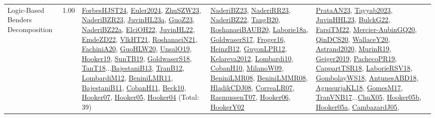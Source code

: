 {\begin{longtable}{p{3cm}r>{\raggedright\arraybackslash}p{6cm}>{\raggedright\arraybackslash}p{6cm}>{\raggedright\arraybackslash}p{8cm}}
\index{Logic-Based Benders Decomposition}\index{Concepts!Logic-Based Benders Decomposition}Logic-Based Benders Decomposition &  1.00 & \hyperref[detail:ForbesHJST24]{ForbesHJST24}, \hyperref[detail:Euler2024]{Euler2024}, \hyperref[detail:ZhuSZW23]{ZhuSZW23}, \hyperref[detail:NaderiBZR23]{NaderiBZR23}, \hyperref[detail:JuvinHL23a]{JuvinHL23a}, \hyperref[detail:GuoZ23]{GuoZ23}, \hyperref[detail:NaderiBZ22a]{NaderiBZ22a}, \hyperref[detail:ElciOH22]{ElciOH22}, \hyperref[detail:JuvinHL22]{JuvinHL22}, \hyperref[detail:EmdeZD22]{EmdeZD22}, \hyperref[detail:VlkHT21]{VlkHT21}, \hyperref[detail:RoshanaeiN21]{RoshanaeiN21}, \hyperref[detail:FachiniA20]{FachiniA20}, \hyperref[detail:GuoHLW20]{GuoHLW20}, \hyperref[detail:UnsalO19]{UnsalO19}, \hyperref[detail:Hooker19]{Hooker19}, \hyperref[detail:SunTB19]{SunTB19}, \hyperref[detail:GoldwaserS18]{GoldwaserS18}, \hyperref[detail:TanT18]{TanT18}...\hyperref[detail:BajestaniB13]{BajestaniB13}, \hyperref[detail:TranB12]{TranB12}, \hyperref[detail:LombardiM12]{LombardiM12}, \hyperref[detail:BeniniLMR11]{BeniniLMR11}, \hyperref[detail:BajestaniB11]{BajestaniB11}, \hyperref[detail:CobanH11]{CobanH11}, \hyperref[detail:Beck10]{Beck10}, \hyperref[detail:Hooker07]{Hooker07}, \hyperref[detail:Hooker05]{Hooker05}, \hyperref[detail:Hooker04]{Hooker04} (Total: 39) & \hyperref[detail:NaderiBZ23]{NaderiBZ23}, \hyperref[detail:NaderiRR23]{NaderiRR23}, \hyperref[detail:NaderiBZ22]{NaderiBZ22}, \hyperref[detail:TangB20]{TangB20}, \hyperref[detail:RoshanaeiBAUB20]{RoshanaeiBAUB20}, \hyperref[detail:Laborie18a]{Laborie18a}, \hyperref[detail:GoldwaserS17]{GoldwaserS17}, \hyperref[detail:Froger16]{Froger16}, \hyperref[detail:HeinzB12]{HeinzB12}, \hyperref[detail:GuyonLPR12]{GuyonLPR12}, \hyperref[detail:Kelareva2012]{Kelareva2012}, \hyperref[detail:Lombardi10]{Lombardi10}, \hyperref[detail:CobanH10]{CobanH10}, \hyperref[detail:MilanoW09]{MilanoW09}, \hyperref[detail:BeniniLMR08]{BeniniLMR08}, \hyperref[detail:BeniniLMMR08]{BeniniLMMR08}, \hyperref[detail:HladikCDJ08]{HladikCDJ08}, \hyperref[detail:CorreaLR07]{CorreaLR07}, \hyperref[detail:RasmussenT07]{RasmussenT07}, \hyperref[detail:Hooker06]{Hooker06}, \hyperref[detail:HookerY02]{HookerY02} & \hyperref[detail:PrataAN23]{PrataAN23}, \hyperref[detail:Tayyab2023]{Tayyab2023}, \hyperref[detail:JuvinHHL23]{JuvinHHL23}, \hyperref[detail:BulckG22]{BulckG22}, \hyperref[detail:FarsiTM22]{FarsiTM22}, \hyperref[detail:Mercier-AubinGQ20]{Mercier-AubinGQ20}, \hyperref[detail:QinDCS20]{QinDCS20}, \hyperref[detail:WallaceY20]{WallaceY20}, \hyperref[detail:Astrand2020]{Astrand2020}, \hyperref[detail:MurinR19]{MurinR19}, \hyperref[detail:Geiger2019]{Geiger2019}, \hyperref[detail:PachecoPR19]{PachecoPR19}, \hyperref[detail:CappartTSR18]{CappartTSR18}, \hyperref[detail:LaborieRSV18]{LaborieRSV18}, \hyperref[detail:GombolayWS18]{GombolayWS18}, \hyperref[detail:AntunesABD18]{AntunesABD18}, \hyperref[detail:AgussurjaKL18]{AgussurjaKL18}, \hyperref[detail:GomesM17]{GomesM17}, \hyperref[detail:TranVNB17]{TranVNB17}...\hyperref[detail:ChuX05]{ChuX05}, \hyperref[detail:Hooker05b]{Hooker05b}, \hyperref[detail:Hooker05a]{Hooker05a}, \hyperref[detail:CambazardJ05]{CambazardJ05}, 
\end{longtable}}
